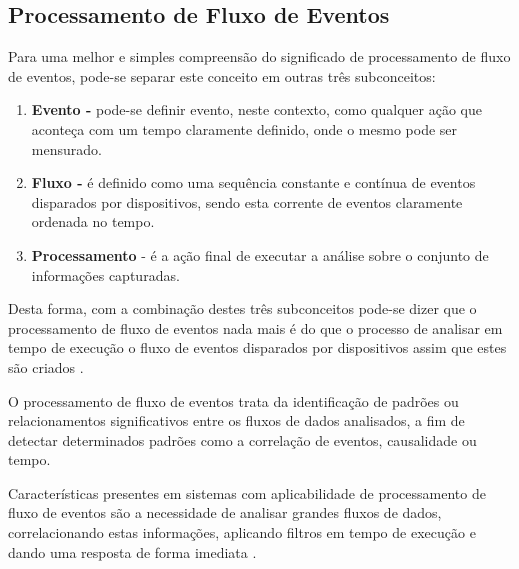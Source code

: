\documentclass[ti,table]{texufpel} %
\begin{document}
  

\subsection{Processamento de Fluxo de Eventos} 

  

Para uma melhor e simples compreensão do significado de processamento de fluxo de eventos, pode-se separar este conceito em outras três subconceitos: 


\begin{enumerate} 

    \item  \textbf{Evento -} pode-se definir evento, neste contexto, como qualquer ação que aconteça com um tempo claramente definido, onde o mesmo pode ser mensurado.   

     

    \item  \textbf{Fluxo -} é definido como uma sequência constante e contínua de eventos disparados por dispositivos, sendo esta corrente de eventos claramente ordenada no tempo. 

     

    \item  \textbf{Processamento} - é a ação final de executar a análise sobre o conjunto de informações capturadas. 

\end{enumerate} 

Desta forma, com a combinação destes três subconceitos pode-se dizer que o processamento de fluxo de eventos nada mais é do que o processo de analisar em tempo de execução o fluxo de eventos disparados por dispositivos assim que estes são criados \cite{dayarathna2018recent}.  

  

O processamento de fluxo de eventos trata da identificação de padrões ou relacionamentos significativos entre os fluxos de dados analisados, a fim de detectar determinados padrões como a correlação de eventos, causalidade ou tempo. 

Características presentes em sistemas com aplicabilidade de processamento de fluxo de eventos são a necessidade de analisar grandes fluxos de dados, correlacionando estas informações, aplicando filtros em tempo de execução e dando uma resposta de forma imediata \cite{appel2013event}. 
\end{document}
